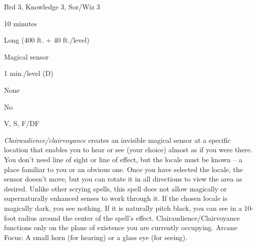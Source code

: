 
\begin{description*}
\item[Level:] Brd 3, Knowledge 3, Sor/Wiz 3
\item[Casting Time:] 10 minutes
\item[Range:] Long (400 ft. + 40 ft./level)
\item[Effect:] Magical sensor
\item[Duration:] 1 min./level (D)
\item[Saving Throw:] None
\item[Spell Resistance:] No
\item[Components:] V, S, F/DF
\end{description*}

\textit{Clairaudience/clairvoyance} creates an invisible magical sensor at a specific
location that enables you to hear or see (your choice) almost as if you were there.
You don't need line of sight or line of effect, but the locale must be known -- a
place familiar to you or an obvious one. Once you have selected the locale, the
sensor doesn't move, but you can rotate it in all directions to view the area as
desired. Unlike other scrying spells, this spell does not allow magically or supernaturally
enhanced senses to work through it. If the chosen locale is magically dark, you
see nothing. If it is naturally pitch black, you can see in a 10- foot radius around
the center of the spell's effect. Clairaudience/Clairvoyance functions
only on the plane of existence you are currently occupying.
Arcane Focus: A small horn (for hearing) or a glass eye (for seeing).